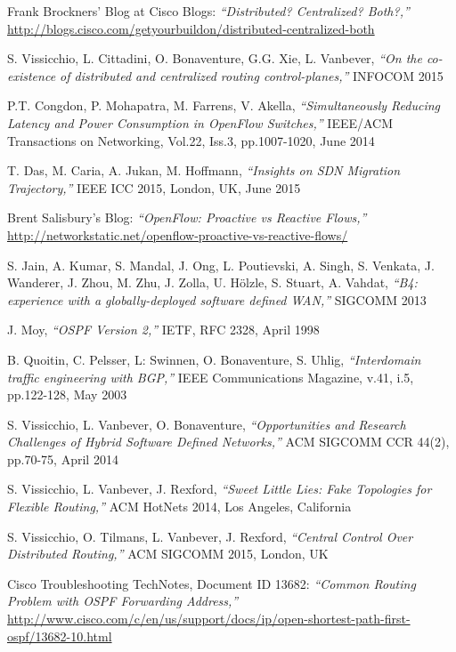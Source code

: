 \documentclass[journal]{IEEEtran}
\begin{document}
\begin{thebibliography}{1}
 Frank Brockners' Blog at Cisco Blogs: \emph{``Distributed? Centralized? Both?,''} \url{http://blogs.cisco.com/getyourbuildon/distributed-centralized-both}

 S. Vissicchio, L. Cittadini, O. Bonaventure, G.G. Xie, L. Vanbever, \emph{``On the co-existence of distributed and centralized routing control-planes,''} INFOCOM 2015

 P.T. Congdon, P. Mohapatra, M. Farrens, V. Akella, \emph{``Simultaneously Reducing Latency and Power Consumption in OpenFlow Switches,''} IEEE/ACM Transactions on Networking, Vol.22, Iss.3, pp.1007-1020, June 2014

 T. Das, M. Caria, A. Jukan, M. Hoffmann, \emph{``Insights on SDN Migration Trajectory,''} IEEE ICC 2015, London, UK, June 2015

 Brent Salisbury's Blog: \emph{``OpenFlow: Proactive vs Reactive Flows,''}  \url{http://networkstatic.net/openflow-proactive-vs-reactive-flows/}

 S. Jain, A. Kumar, S. Mandal, J. Ong, L. Poutievski, A. Singh, S. Venkata, J. Wanderer, J. Zhou, M. Zhu, J. Zolla, U. H{\"o}lzle, S. Stuart, A. Vahdat, \emph{``B4: experience with a globally-deployed software defined WAN,''} SIGCOMM 2013

 J. Moy, \emph{``OSPF Version 2,''} IETF, RFC 2328, April 1998

 B. Quoitin, C. Pelsser, L: Swinnen, O. Bonaventure, S. Uhlig, \emph{``Interdomain traffic engineering with BGP,''} IEEE Communications Magazine, v.41, i.5, pp.122-128, May 2003

 S. Vissicchio, L. Vanbever, O. Bonaventure, \emph{``Opportunities and Research Challenges of Hybrid Software Defined Networks,''} ACM SIGCOMM CCR 44(2), pp.70-75, April 2014

 S. Vissicchio, L. Vanbever, J. Rexford, \emph{``Sweet Little Lies: Fake Topologies for Flexible Routing,''} ACM HotNets 2014, Los Angeles, California

 S. Vissicchio, O. Tilmans, L. Vanbever, J. Rexford, \emph{``Central Control Over Distributed Routing,''} ACM SIGCOMM 2015, London, UK

 Cisco Troubleshooting TechNotes, Document ID 13682: \emph{``Common Routing Problem with OSPF Forwarding Address,''} \url{http://www.cisco.com/c/en/us/support/docs/ip/open-shortest-path-first-ospf/13682-10.html}


\end{thebibliography}
\end{document}
